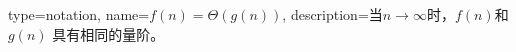 {
  type=notation,
  name={$f(n)=\Theta(g(n))$},
  description={当$n\to \infty$时，$f(n)$和$g(n)$ 具有相同的量阶。}
}
\printglossary[type=notation, nonumberlist=true]
